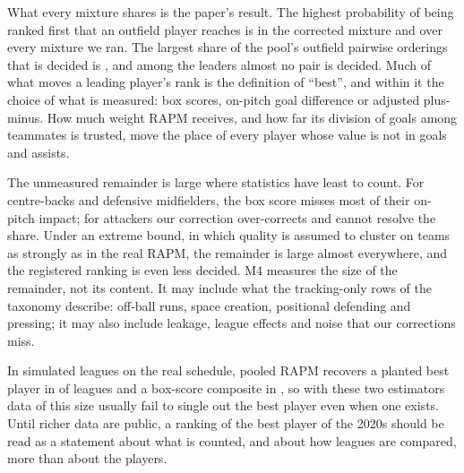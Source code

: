\documentclass[11pt,a4paper]{article}
\begin{document}
What every mixture shares is the paper's result. The highest probability of
being ranked first that an outfield player reaches is \CorrectedTopPFirst{}
in the corrected mixture and \AllVariantsMaxPFirst{} over every mixture we
ran. The largest share of the pool's outfield pairwise orderings that is
decided is \AllVariantsMaxDecided{}, and among the leaders almost no pair is
decided. Much
of what moves a leading player's rank is the definition of ``best'', and
within it the choice of what is measured: box scores, on-pitch goal difference
or adjusted plus-minus. How much weight RAPM receives, and how far its
division of goals among teammates is trusted, move the place of every player
whose value is not in goals and assists.

The unmeasured remainder is large where statistics have least to count. For
centre-backs and defensive midfielders, the box score misses most of their
on-pitch impact; for attackers our correction over-corrects and cannot resolve
the share. Under an extreme bound, in which quality is assumed to cluster on
teams as strongly as in the real RAPM, the remainder is large almost
everywhere, and the registered ranking is even less decided. M4 measures the
size of the remainder, not its content. It may include what the tracking-only
rows of the taxonomy describe: off-ball runs, space creation, positional
defending and pressing; it may also include leakage, league effects and noise
that our corrections miss.

In simulated leagues on the real schedule, pooled RAPM recovers a planted best
player in \RecoveryRapmFirst{} of leagues and a box-score composite in
\RecoveryBoxFirst{}, so with these two estimators data of this size usually
fail to single out the best player even when one exists. Until richer data are
public, a ranking of the best player of the 2020s should be read as a
statement about what is counted, and about how leagues are compared, more than
about the players.
\end{document}
